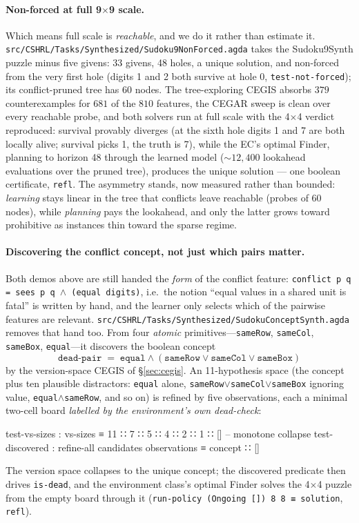 \documentclass[9pt,a4paper]{article}
\newcommand{\fpath}[1]{\nolinkurl{#1}}
\theoremstyle{plain}
\theoremstyle{definition}
\theoremstyle{remark}
\begin{document}
\paragraph{Non-forced at full 9$\times$9 scale.}  Which means full scale is \emph{reachable}, and we do it rather than estimate it.  \fpath{src/CSHRL/Tasks/Synthesized/Sudoku9NonForced.agda} takes the Sudoku9Synth puzzle minus five givens: 33 givens, 48 holes, a unique solution, and non-forced from the very first hole (digits 1 and 2 both survive at hole 0, \texttt{test-not-forced}); its conflict-pruned tree has 60 nodes.  The tree-exploring CEGIS absorbs $379$ counterexamples for $681$ of the $810$ features, the CEGAR sweep is clean over every reachable probe, and both solvers run at full scale with the 4$\times$4 verdict reproduced: survival provably diverges (at the sixth hole digits 1 and 7 are both locally alive; survival picks 1, the truth is 7), while the EC's optimal Finder, planning to horizon 48 through the learned model (${\sim}12{,}400$ lookahead evaluations over the pruned tree), produces the unique solution --- one boolean certificate, \texttt{refl}.  The asymmetry stands, now measured rather than bounded: \emph{learning} stays linear in the tree that conflicts leave reachable (probes of 60 nodes), while \emph{planning} pays the lookahead, and only the latter grows toward prohibitive as instances thin toward the sparse regime.

\paragraph{Discovering the conflict concept, not just which pairs matter.}  Both demos above are still handed the \emph{form} of the conflict feature: \texttt{conflict p q = sees p q \(\wedge\) (equal digits)}, i.e.\ the notion ``equal values in a shared unit is fatal'' is written by hand, and the learner only selects which of the pairwise features are relevant.  \fpath{src/CSHRL/Tasks/Synthesized/SudokuConceptSynth.agda} removes that hand too.  From four \emph{atomic} primitives---\texttt{sameRow}, \texttt{sameCol}, \texttt{sameBox}, \texttt{equal}---it discovers the boolean concept
\[
  \texttt{dead-pair} \;=\; \texttt{equal} \wedge (\texttt{sameRow} \vee \texttt{sameCol} \vee \texttt{sameBox})
\]
by the version-space CEGIS of \S\ref{sec:cegis}.  An 11-hypothesis space (the concept plus ten plausible distractors: \texttt{equal} alone, \texttt{sameRow\(\vee\)sameCol\(\vee\)sameBox} ignoring value, \texttt{equal\(\wedge\)sameRow}, and so on) is refined by five observations, each a minimal two-cell board \emph{labelled by the environment's own dead-check}:
\begin{spec}
test-vs-sizes   : vs-sizes ≡ 11 ∷ 7 ∷ 5 ∷ 4 ∷ 2 ∷ 1 ∷ []   -- monotone collapse
test-discovered : refine-all candidates observations ≡ concept ∷ []
\end{spec}
The version space collapses to the unique concept; the discovered predicate then drives \texttt{is-dead}, and the environment class's optimal Finder solves the 4$\times$4 puzzle from the empty board through it (\texttt{run-policy (Ongoing []) 8 8 ≡ solution}, \texttt{refl}).
\end{document}
